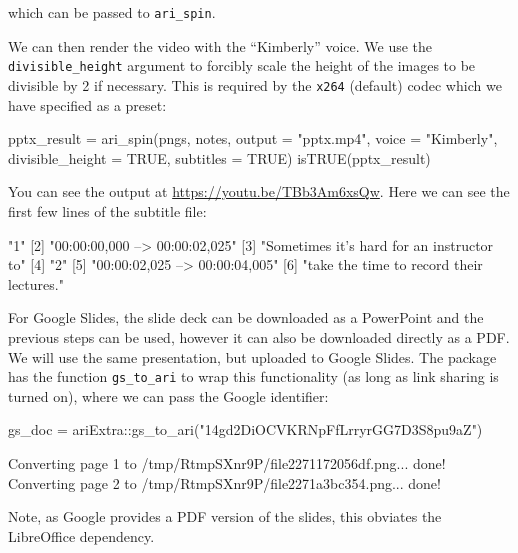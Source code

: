 which can be passed to \texttt{ari\_spin}.

We can then render the video with the ``Kimberly'' voice. We use the
\texttt{divisible\_height} argument to forcibly scale the height of the
images to be divisible by 2 if necessary. This is required by the
\texttt{x264} (default) codec which we have specified as a preset:

\begin{Schunk}
\begin{Sinput}
pptx_result = ari_spin(pngs, notes, output = "pptx.mp4", voice = "Kimberly",
    divisible_height = TRUE, subtitles = TRUE)
isTRUE(pptx_result)
\end{Sinput}
\end{Schunk}

You can see the output at \url{https://youtu.be/TBb3Am6xsQw}. Here we
can see the first few lines of the subtitle file:

\begin{Schunk}
\begin{Soutput}
[1] "1"                                       
[2] "00:00:00,000 --> 00:00:02,025"           
[3] "Sometimes it’s hard for an instructor to"
[4] "2"                                       
[5] "00:00:02,025 --> 00:00:04,005"           
[6] "take the time to record their lectures." 
\end{Soutput}
\end{Schunk}

For Google Slides, the slide deck can be downloaded as a PowerPoint and
the previous steps can be used, however it can also be downloaded
directly as a PDF. We will use the same presentation, but uploaded to
Google Slides. The  package has the function
\texttt{gs\_to\_ari} to wrap this functionality (as long as link sharing
is turned on), where we can pass the Google identifier:

\begin{Schunk}
\begin{Sinput}
gs_doc = ariExtra::gs_to_ari("14gd2DiOCVKRNpFfLrryrGG7D3S8pu9aZ")
\end{Sinput}
\begin{Soutput}
Converting page 1 to /tmp/RtmpSXnr9P/file2271172056df.png... done!
Converting page 2 to /tmp/RtmpSXnr9P/file2271a3bc354.png... done!
\end{Soutput}
\end{Schunk}

Note, as Google provides a PDF version of the slides, this obviates the
LibreOffice dependency.

